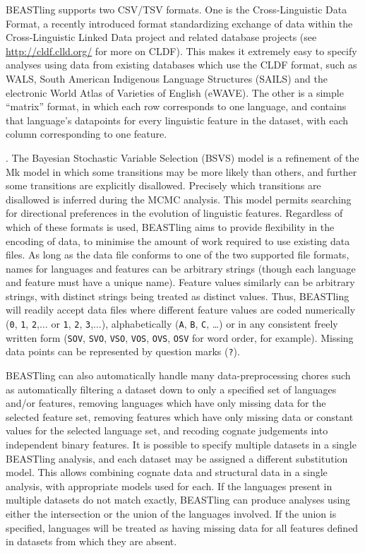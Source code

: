 \documentclass[twocolumn,10pt]{scrartcl}
\begin{document}
BEASTling supports two CSV/TSV formats.  One is the Cross-Linguistic Data Format\cite{Forkel2016}, a recently introduced format standardizing exchange of data within the Cross-Linguistic Linked Data project and related database projects (see \url{http://cldf.clld.org/} for more on CLDF).  This makes it extremely easy to specify analyses using data from existing databases which use the CLDF format, such as WALS, South American Indigenous Language Structures\cite{Muysken2014} (SAILS) and the electronic World Atlas of Varieties of English\cite{Kortmann2013} (eWAVE).  The other is a simple ``matrix'' format, in which each row corresponds to one language, and contains that language's datapoints for every linguistic feature in the dataset, with each column corresponding to one feature.

.  The Bayesian Stochastic Variable Selection (BSVS) model is a refinement of the Mk model in which some transitions may be more likely than others, and further some transitions are explicitly disallowed.  Precisely which transitions are disallowed is inferred during the MCMC analysis.  This model permits searching for directional preferences in the evolution of linguistic features.
Regardless of which of these formats is used, BEASTling aims to provide flexibility in the encoding of data, to minimise the amount of work required to use existing data files.  As long as the data file conforms to one of the two supported file formats, names for languages and features can be arbitrary strings (though each language and feature must have a unique name).  Feature values similarly can be arbitrary strings, with distinct strings being treated as distinct values.  Thus, BEASTling will readily accept data files where different feature values are coded numerically (\texttt{0}, \texttt{1}, \texttt{2},$\ldots$ or \texttt{1}, \texttt{2}, \texttt{3},$\ldots$), alphabetically (\texttt{A}, \texttt{B}, \texttt{C}, \ldots) or in any consistent freely written form (\texttt{SOV}, \texttt{SVO}, \texttt{VSO}, \texttt{VOS}, \texttt{OVS}, \texttt{OSV} for word order, for example).  Missing data points can be represented by question marks (\texttt{?}).

BEASTling can also automatically handle many data-preprocessing chores such as automatically filtering a dataset down to only a specified set of languages and/or features, removing languages which have only missing data for the selected feature set, removing features which have only missing data or constant values for the selected language set, and recoding cognate judgements into independent binary features.  It is possible to specify multiple datasets in a single BEASTling analysis, and each dataset may be assigned a different substitution model.  This allows combining cognate data and structural data in a single analysis, with appropriate models used for each.  If the languages present in multiple datasets do not match exactly, BEASTling can produce analyses using either the intersection or the union of the languages involved.  If the union is specified, languages will be treated as having missing data for all features defined in datasets from which they are absent.
\end{document}
